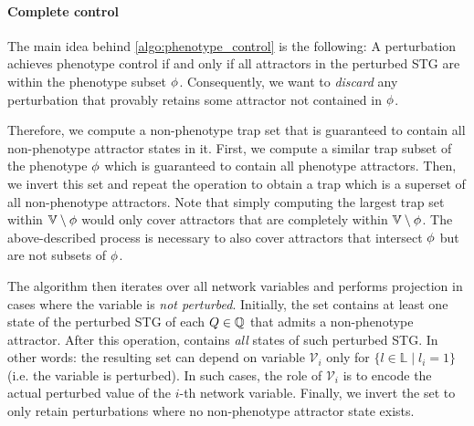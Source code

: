 \paragraph{Complete control} The main idea behind \autoref{algo:phenotype_control} is the following: A perturbation achieves phenotype control if and only if all attractors in the perturbed STG are within the phenotype subset $\phi$. Consequently, we want to \emph{discard} any perturbation that provably retains some attractor not contained in $\phi$. 



Therefore, we compute a non-phenotype trap set that is guaranteed to contain all non-phenotype attractor states in it. First, we compute a similar trap subset of the phenotype $\phi$ which is guaranteed to contain all phenotype attractors. Then, we invert this set and repeat the operation to obtain a trap which is a superset of all non-phenotype attractors. Note that simply computing the largest trap set within $\mathbb{V} \setminus \phi$ would only cover attractors that are completely within $\mathbb{V} \setminus \phi$. The above-described process is necessary to also cover attractors that intersect $\phi$ but are not subsets of $\phi$.

The algorithm then iterates over all network variables and performs projection in cases where the variable is \emph{not perturbed}. Initially, the  set contains at least one state of the perturbed STG of each $Q \in \mathbb{Q}$ that admits a non-phenotype attractor. After this operation,  contains \emph{all} states of such perturbed STG. In other words: the resulting set can depend on variable $\mathcal{V}_i$ only for $\{ l \in \mathbb{L} \mid l_i = 1 \}$ (i.e. the variable is perturbed). In such cases, the role of $\mathcal{V}_i$ is to encode the actual perturbed value of the $i$-th network variable. Finally, we invert the  set to only retain perturbations where no non-phenotype attractor state exists.


